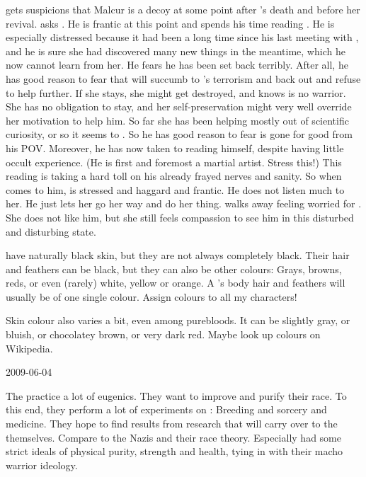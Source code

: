 \Achsah gets suspicions that Malcur is a decoy at some point after \Urizeth's death and before her revival.
\Achsah asks \Teshrial. 
He is frantic at this point and spends his time reading \WanderersInDarknessEmph. 
He is especially distressed because it had been a long time since his last meeting with \Urizeth, and he is sure she had discovered many new things in the meantime, which he now cannot learn from her. 
He fears he has been set back terribly.
After all, he has good reason to fear that \Urizeth will succumb to \Ishnaruchaefir's terrorism and back out and refuse to help \Teshrial further.
If she stays, she might get destroyed, and \Teshrial knows \Urizeth is no warrior.
She has no obligation to stay, and her self-preservation might very well override her motivation to help him.
So far she has been helping \Teshrial mostly out of scientific curiosity, or so it seems to \Teshrial.
So he has good reason to fear \Urizeth is gone for good from his POV.
Moreover, he has now taken to reading \WanderersInDarknessEmph himself, despite having little occult experience. 
(He is first and foremost a martial artist. Stress this!)
This reading is taking a hard toll on his already frayed nerves and sanity.
So when \Achsah comes to him, \Teshrial is stressed and haggard and frantic.
He does not listen much to her. 
He just lets her go her way and do her thing.
\Achsah walks away feeling worried for \Teshrial. 
She does not like him, but she still feels compassion to see him in this disturbed and disturbing state.

\Resphain have naturally black skin, but they are not always completely black.
Their hair and feathers can be black, but they can also be other colours: Grays, browns, reds, or even (rarely) white, yellow or orange.
A \resphan's body hair and feathers will usually be of one single colour.
Assign colours to all my \resphan characters!

Skin colour also varies a bit, even among purebloods. 
It can be slightly gray, or bluish, or chocolatey brown, or very dark red.
Maybe look up colours on Wikipedia.



2009-06-04

The \resphain practice a lot of eugenics.
They want to improve and purify their race. 
To this end, they perform a lot of experiments on \humans:
Breeding and sorcery and medicine. 
They hope to find results from \human research that will carry over to the \resphain themselves. 
Compare to the Nazis and their race theory. 
Especially \Mystraacht had some strict ideals of physical purity, strength and health, tying in with their macho warrior ideology.



